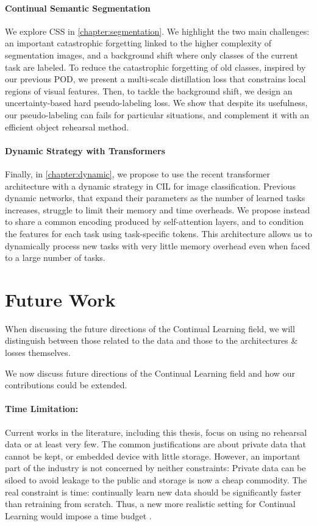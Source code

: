 \paragraph{Continual Semantic Segmentation} We explore \ac{CSS} in \autoref{chapter:segmentation}.
We highlight the two main challenges: an important catastrophic forgetting linked to the higher
complexity of segmentation images, and a background shift where only classes of the current task are
labeled. To reduce the catastrophic forgetting of old classes, inspired by our previous POD, we
present a multi-scale distillation loss that constrains local regions of visual features. Then, to
tackle the background shift, we design an uncertainty-based hard pseudo-labeling loss. We show that
despite its usefulness, our pseudo-labeling can fails for particular situations, and complement it
with an efficient object rehearsal method.

\paragraph{Dynamic Strategy with Transformers} Finally, in \autoref{chapter:dynamic}, we propose to
use the recent transformer architecture with a dynamic strategy in \acf{CIL} for image
classification. Previous dynamic networks, that expand their parameters as the number of learned
tasks increases, struggle to limit their memory and time overheads. We propose instead to share a
common encoding produced by self-attention layers, and to condition the features for each task using
task-specific tokens. This architecture allows us to dynamically process new tasks with very little
memory overhead even when faced to a large number of tasks.

\section{Future Work}

When discussing the future directions of the Continual Learning field, we will distinguish between
those related to the data and those to the architectures \& losses themselves.

We now discuss future directions of the Continual Learning field and how our contributions could be
extended.

\paragraph{Time Limitation:} Current works in the literature, including this thesis, focus on using
no rehearsal data or at least very few. The common justifications are about private data that cannot
be kept, or embedded device with little storage. However, an important part of the industry is not
concerned by neither constraints: Private data can be siloed to avoid leakage to the public and
storage is now a cheap commodity. The real constraint is time: continually learn new data should be
significantly faster than retraining from scratch. Thus, a new more realistic setting for Continual
Learning would impose a time budget \citep{veniat2018budgetedlearning}.

